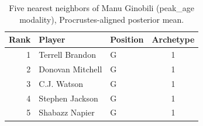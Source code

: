 \begin{table}[htbp]
  \centering\small
  \begin{tabular}{rllc}
    \toprule
    Rank & Player & Position & Archetype \\
    \midrule
    1 & Terrell Brandon & G & 1 \\
    2 & Donovan Mitchell & G & 1 \\
    3 & C.J. Watson & G & 1 \\
    4 & Stephen Jackson & G & 1 \\
    5 & Shabazz Napier & G & 1 \\
    \bottomrule
  \end{tabular}
  \caption{Five nearest neighbors of Manu Ginobili (peak_age modality), Procrustes-aligned posterior mean.}
  \label{tab:Manu_Ginobili_neighbors_peak_age}
\end{table}

